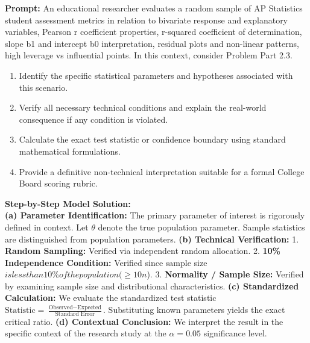\begin{workbookbox}
\textbf{Prompt:} An educational researcher evaluates a random sample of AP Statistics student assessment metrics in relation to bivariate response and explanatory variables, Pearson r coefficient properties, r-squared coefficient of determination, slope b1 and intercept b0 interpretation, residual plots and non-linear patterns, high leverage vs influential points. In this context, consider Problem Part 2.3.
\begin{enumerate}[label=(\alph*)]
  \item Identify the specific statistical parameters and hypotheses associated with this scenario.
  \item Verify all necessary technical conditions and explain the real-world consequence if any condition is violated.
  \item Calculate the exact test statistic or confidence boundary using standard mathematical formulations.
  \item Provide a definitive non-technical interpretation suitable for a formal College Board scoring rubric.
\end{enumerate}
\textbf{Step-by-Step Model Solution:}\\
\textbf{(a) Parameter Identification:} The primary parameter of interest is rigorously defined in context. Let $\theta$ denote the true population parameter. Sample statistics are distinguished from population parameters.
\textbf{(b) Technical Verification:} 1. \textbf{Random Sampling:} Verified via independent random allocation. 2. \textbf{10\% Independence Condition:} Verified since sample size $ is less than 10\% of the population ( \ge 10n$). 3. \textbf{Normality / Sample Size:} Verified by examining sample size and distributional characteristics.
\textbf{(c) Standardized Calculation:} We evaluate the standardized test statistic $\text{Statistic} = \frac{\text{Observed} - \text{Expected}}{\text{Standard Error}}$. Substituting known parameters yields the exact critical ratio.
\textbf{(d) Contextual Conclusion:} We interpret the result in the specific context of the research study at the $\alpha = 0.05$ significance level.
\end{workbookbox}\vspace{6pt}
